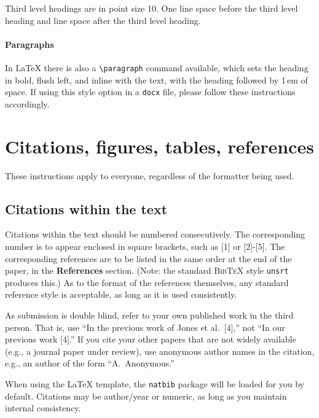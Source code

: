 \documentclass{article}
\begin{document}
Third level headings are in point size 10. One line space before the third level heading and  line space after the third level heading. 

\paragraph{Paragraphs}

In \LaTeX{} there is also a \verb+\paragraph+ command available, which sets the heading in bold, flush left, and inline with the text, with the heading followed by 1\,em of space. If using this style option in a \verb+docx+ file, please follow these instructions accordingly.

\section{Citations, figures, tables, references}
\label{others}

These instructions apply to everyone, regardless of the formatter being used.

\subsection{Citations within the text}

Citations within the text should be numbered consecutively.  The corresponding number is to appear enclosed in square brackets, such as [1] or [2]-[5].  The corresponding references are to be listed in the same order at the end of the paper, in the \textbf{References} section. (Note: the standard
\textsc{Bib\TeX} style \texttt{unsrt} produces this.) As to the format of the references themselves, any standard reference style is acceptable, as long as it is used consistently.


As submission is double blind, refer to your own published work in the third
person. That is, use ``In the previous work of Jones et al.\ [4],'' not ``In our
previous work [4].'' If you cite your other papers that are not widely available
(e.g., a journal paper under review), use anonymous author names in the
citation, e.g., an author of the form ``A.\ Anonymous.''

When using the \LaTeX{} template, the \verb+natbib+ package will be loaded for you by default.  Citations may be author/year or numeric, as long as you maintain internal consistency.
\end{document}
